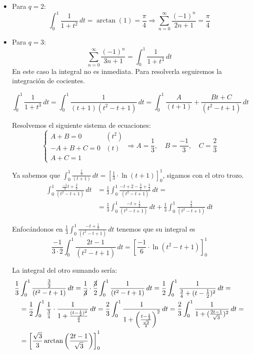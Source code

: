 \documentclass[12pt]{article}
\begin{document}
\begin{ejercicio}[2 puntos]
\begin{enumerate}[label=\alph*)]
\begin{itemize}
				\item Para $q = 2$:
				$$ \int_0^1 \frac{1}{1 + t^2} \, dt = \arctan(1) = \frac{\pi}{4}
					\Rightarrow \sum_{n=0}^{\infty} \frac{(-1)^n}{2n + 1} = \frac{\pi}{4}$$
					
				\item Para $q = 3$:
				$$\sum_{n=0}^{\infty} \frac{(-1)^n}{3n + 1} = \int_0^1 \frac{1}{1 + t^3} \, dt$$
				En este caso la integral no es inmediata. Para resolverla seguiremos la integración de cocientes.
				
				$$\int_0^1 \frac{1}{1 + t^3} \, dt = \int_0^1 \frac{1}{(t+1)(t^2-t+1)} \, dt = \int_0^1 \frac{A}{(t+1)}+\frac{Bt+C}{(t^2-t+1)} \, dt$$
				
				Resolvemos el siguiente sistema de ecuaciones:
				$$ \begin{cases}
					A+B=0 & (t^2)\\
					-A+B+C = 0 & (t)\\
					A+C=1 
				\end{cases}
				\Rightarrow A=\frac{1}{3}, \quad B=\frac{-1}{3}, \quad
				C=\frac{2}{3}$$
				
				Ya sabemos que $\displaystyle \int_0^1 \frac{\frac{1}{3}}{(t+1)} \, dt = \left[\frac{1}{3}\cdot \ln(t+1)\right]^1_0$, sigamos con el otro trozo.
				\begin{align*}
					\int_0^1 \frac{\frac{-1}{3}t+\frac{2}{3}}{(t^2-t+1)} \, dt &= \frac{1}{3}\int_0^1 \frac{-t+2-\frac{3}{2}+\frac{3}{2}}{(t^2-t+1)} \, dt =\\&= \frac{1}{3}\int_0^1 \frac{-t+\frac{1}{2}}{(t^2-t+1)} \, dt +  \frac{1}{3}\int_0^1 \frac{\frac{3}{2}}{(t^2-t+1)} \, dt
				\end{align*}
				
				Enfocándonos en 
				$\displaystyle \frac{1}{3}\int_0^1 \frac{-t+\frac{1}{2}}{(t^2-t+1)} \, dt$ tenemos que su integral es
				$$\frac{-1}{3\cdot 2}\int_0^1 \frac{2t-1}{(t^2-t+1)} \, dt = \left[\frac{-1}{6}\cdot\ln(t^2-t+1)\right]^1_0$$
				
				La integral del otro sumando sería:
				\begin{align*}
					\frac{1}{3}&\int_0^1 \frac{\frac{3}{2}}{(t^2-t+1)} \, dt = \frac{1}{\cancel{3}}\cdot\frac{\cancel{3}}{2}\int_0^1 \frac{1}{(t^2-t+1)} \, dt = \frac{1}{2}\int_0^1 \frac{1}{\frac{3}{4}+(t-\frac{1}{2})^2} \, dt
					=\\&= \frac{1}{2}\int_0^1 \frac{1}{\frac{3}{4}} \cdot \frac{1}{1+\frac{(t-\frac{1}{2})^2}{\frac{3}{4}}} \, dt = \frac{2}{3}\int_0^1 \frac{1}{1+\left(\frac{t-\frac{1}{2}}{\frac{\sqrt{3}}{2}}\right)^2} \, dt = \frac{2}{3}\int_0^1 \frac{1}{1+(\frac{2t-1}{\sqrt{3}})^2} \, dt
					=\\&=
					\left[\frac{\sqrt{3}}{3}\arctan\left(\frac{2t-1}{\sqrt{3}}\right)\right]^1_0
				\end{align*}
				

\end{itemize}
\end{enumerate}
\end{ejercicio}
\end{document}
